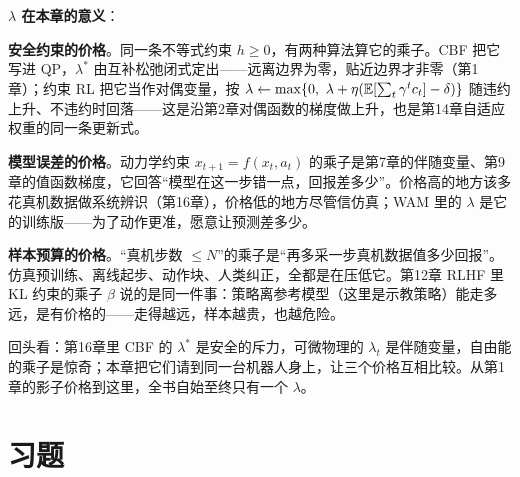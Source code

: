 \begin{physicalmeaning}
\textbf{$\lambda$ 在本章的意义}：

\textbf{安全约束的价格}。同一条不等式约束 $h \ge 0$，有两种算法算它的乘子。CBF 把它写进 QP，$\lambda^*$ 由互补松弛闭式定出——远离边界为零，贴近边界才非零（第1章）；约束 RL 把它当作对偶变量，按 $\lambda \leftarrow \max\{0,\ \lambda + \eta(\mathbb{E}[\sum_t \gamma^t c_t] - \delta)\}$ 随违约上升、不违约时回落——这是沿第2章对偶函数的梯度做上升，也是第14章自适应权重的同一条更新式。

\textbf{模型误差的价格}。动力学约束 $x_{t+1} = f(x_t, a_t)$ 的乘子是第7章的伴随变量、第9章的值函数梯度，它回答“模型在这一步错一点，回报差多少”。价格高的地方该多花真机数据做系统辨识（第16章），价格低的地方尽管信仿真；WAM 里的 $\lambda$ 是它的训练版——为了动作更准，愿意让预测差多少。

\textbf{样本预算的价格}。“真机步数 $\le N$”的乘子是“再多采一步真机数据值多少回报”。仿真预训练、离线起步、动作块、人类纠正，全都是在压低它。第12章 RLHF 里 KL 约束的乘子 $\beta$ 说的是同一件事：策略离参考模型（这里是示教策略）能走多远，是有价格的——走得越远，样本越贵，也越危险。

回头看：第16章里 CBF 的 $\lambda^*$ 是安全的斥力，可微物理的 $\lambda_t$ 是伴随变量，自由能的乘子是惊奇；本章把它们请到同一台机器人身上，让三个价格互相比较。从第1章的影子价格到这里，全书自始至终只有一个 $\lambda$。
\end{physicalmeaning}

\section{习题}

